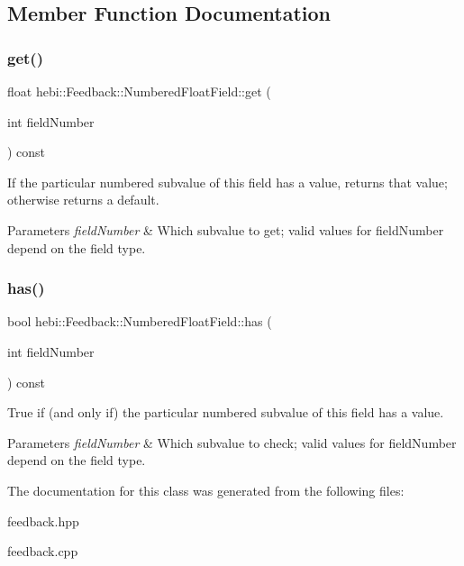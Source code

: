 \subsection{Member Function Documentation}
\mbox{\label{classhebi_1_1Feedback_1_1NumberedFloatField_ae92cf1e2ea88f87d69b04b080509be68}} 
\subsubsection{\texorpdfstring{get()}{get()}}
{\footnotesize\ttfamily float hebi\+::\+Feedback\+::\+Numbered\+Float\+Field\+::get (\begin{DoxyParamCaption}\item[{int}]{field\+Number }\end{DoxyParamCaption}) const}



If the particular numbered subvalue of this field has a value, returns that value; otherwise returns a default. 


\begin{DoxyParams}{Parameters}
{\em field\+Number} & Which subvalue to get; valid values for field\+Number depend on the field type. \\
\hline
\end{DoxyParams}
\mbox{\label{classhebi_1_1Feedback_1_1NumberedFloatField_a2a189c6fe371c3ad031b0a8f9f2d49e5}} 
\subsubsection{\texorpdfstring{has()}{has()}}
{\footnotesize\ttfamily bool hebi\+::\+Feedback\+::\+Numbered\+Float\+Field\+::has (\begin{DoxyParamCaption}\item[{int}]{field\+Number }\end{DoxyParamCaption}) const}



True if (and only if) the particular numbered subvalue of this field has a value. 


\begin{DoxyParams}{Parameters}
{\em field\+Number} & Which subvalue to check; valid values for field\+Number depend on the field type. \\
\hline
\end{DoxyParams}


The documentation for this class was generated from the following files\+:\begin{DoxyCompactItemize}
\item 
feedback.\+hpp\item 
feedback.\+cpp\end{DoxyCompactItemize}

